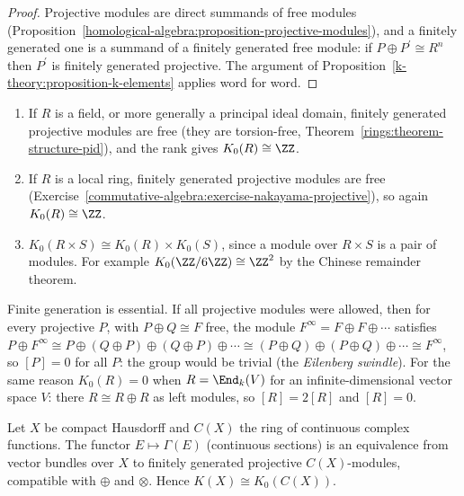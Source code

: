 \begin{proof}
Projective modules are direct summands of free modules (Proposition~\ref{homological-algebra:proposition-projective-modules}), and a finitely generated one is a summand of a finitely generated free module: if
$P \oplus P^{\prime} \cong R^n$ then $P^{\prime}$ is finitely generated projective. The argument of Proposition~\ref{k-theory:proposition-k-elements} applies word for word.
\end{proof}

\begin{example}\label{k-theory:example-k-zero}
\begin{enumerate}
\item If $R$ is a field, or more generally a principal ideal domain, finitely generated projective modules are free (they are torsion-free, Theorem~\ref{rings:theorem-structure-pid}), and the rank gives
$K_0(R) \cong \ZZ$.
\item If $R$ is a local ring, finitely generated projective modules are free (Exercise~\ref{commutative-algebra:exercise-nakayama-projective}), so again $K_0(R) \cong \ZZ$.
\item $K_0(R \times S) \cong K_0(R) \times K_0(S)$, since a module over $R \times S$ is a pair of modules. For example $K_0(\ZZ/6\ZZ) \cong \ZZ^2$ by the Chinese remainder theorem.
\end{enumerate}
\end{example}

\begin{counterexample}\label{k-theory:counterexample-eilenberg-swindle}
Finite generation is essential. If all projective modules were allowed, then for every projective $P$, with $P \oplus Q \cong F$ free, the module $F^\infty = F \oplus F \oplus \cdots$ satisfies
$P \oplus F^\infty \cong P \oplus (Q \oplus P) \oplus (Q \oplus P) \oplus \cdots \cong (P \oplus Q) \oplus (P \oplus Q) \oplus \cdots \cong F^\infty$, so $[P] = 0$ for all $P$: the group would be trivial
(the \emph{Eilenberg swindle}). For the same reason $K_0(R) = 0$ when $R = \End_k(V)$ for an infinite-dimensional vector space $V$: there $R \cong R \oplus R$ as left modules, so $[R] = 2[R]$ and $[R] = 0$.
\end{counterexample}

\begin{theorem}\label{k-theory:theorem-serre-swan}
Let $X$ be compact Hausdorff and $C(X)$ the ring of continuous complex functions. The functor $E \mapsto \Gamma(E)$ (continuous sections) is an equivalence from vector bundles over $X$ to finitely generated
projective $C(X)$-modules, compatible with $\oplus$ and $\otimes$. Hence $K(X) \cong K_0(C(X))$.
\end{theorem}

